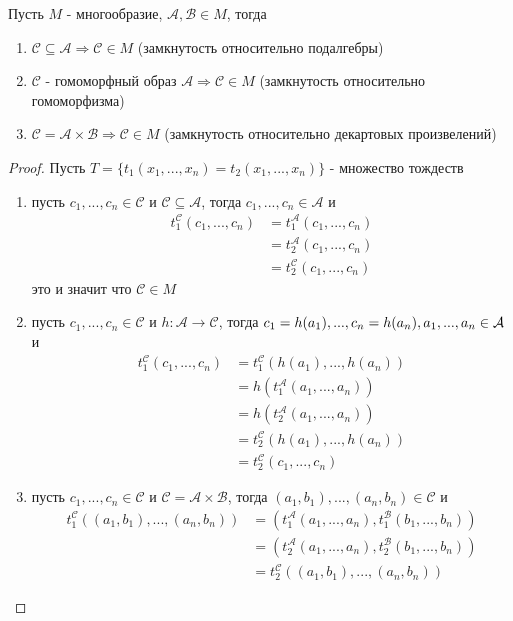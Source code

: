 \documentclass[../main/document.tex]{subfiles}
\begin{document}
\begin{thm}
Пусть $M$ - многообразие, $\mathcal{A},\mathcal{B}\in M$, тогда
\begin{enumerate}
\item $\mathcal{C}\subseteq \mathcal{A}\Rightarrow \mathcal{C}\in M$ (замкнутость относительно подалгебры)
\item $\mathcal{C}$ - гомоморфный образ $\mathcal{A}\Rightarrow \mathcal{C}\in M$ (замкнутость относительно гомоморфизма)
\item $\mathcal{C}= \mathcal{A}\times\mathcal{B} \Rightarrow \mathcal{C}\in M$ (замкнутость относительно декартовых произвелений)
\end{enumerate}
\begin{proof}
Пусть $T=\{t_1(x_1,...,x_n)=t_2(x_1,...,x_n)\}$ - множество тождеств
\begin{enumerate}

\item пусть $c_1,...,c_n\in\mathcal{C}$ и $\mathcal{C}\subseteq \mathcal{A}$, тогда $c_1,...,c_n\in\mathcal{A}$ и
\begin{align*}
t^{\mathcal{C}}_1(c_1,...,c_n)&=t^{\mathcal{A}}_1(c_1,...,c_n)\\
&=t^{\mathcal{A}}_2(c_1,...,c_n)\\
&=t^{\mathcal{C}}_2(c_1,...,c_n)
\end{align*}
это и значит что $\mathcal{C}\in M$
\item пусть $c_1,...,c_n\in\mathcal{C}$ и $h:\mathcal{A}\to\mathcal{C}$, тогда $c_1=h(a_1),...,c_n=h(a_n),\,\\a_1,...,a_n\in\mathcal{A} $ и
\begin{align*}
t_1^{\mathcal{C}}(c_1,...,c_n)&=t_1^{\mathcal{C}}(h(a_1),...,h(a_n))\\
&=h(t_1^{\mathcal{A}}(a_1,...,a_n))\\
&=h(t_2^{\mathcal{A}}(a_1,...,a_n))\\
&=t_2^{\mathcal{C}}(h(a_1),...,h(a_n))\\
&=t_2^{\mathcal{C}}(c_1,...,c_n)
\end{align*}
\item пусть $c_1,...,c_n\in\mathcal{C}$ и $\mathcal{C}= \mathcal{A}\times\mathcal{B}$, тогда $(a_1,b_1),...,(a_n,b_n)\in \mathcal{C}$ и
\begin{align*}
t_1^{\mathcal{C}}((a_1,b_1),...,(a_n,b_n))&=(t_1^{\mathcal{A}}(a_1,...,a_n),t_1^{\mathcal{B}}(b_1,...,b_n))\\
&=(t_2^{\mathcal{A}}(a_1,...,a_n),t_2^{\mathcal{B}}(b_1,...,b_n))\\
&=t_2^{\mathcal{C}}((a_1,b_1),...,(a_n,b_n))
\end{align*}
\end{enumerate}
\end{proof}
\end{thm}
\end{document}
